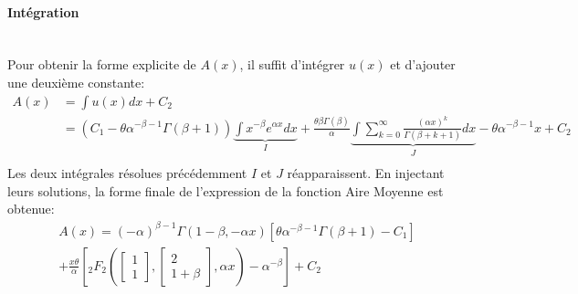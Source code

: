 \paragraph{Intégration}\phantom{}\\
Pour obtenir la forme explicite de $A(x)$, il suffit d'intégrer $u(x)$ et d'ajouter une deuxième constante:
\[
\begin{aligned}
    A(x) &= \int u(x)dx+C_2 \\
    &= (C_1-\theta\alpha^{-\beta-1}\Gamma(\beta+1))\underbrace{\int x^{-\beta}e^{\alpha x}dx}_I +\frac{\theta\beta\Gamma(\beta)}{\alpha}\underbrace{\int\sum_{k=0}^{\infty} \frac{{(\alpha x)}^k}{\Gamma(\beta+k+1)}dx}_J-\theta\alpha^{-\beta-1}x +C_2 \\
\end{aligned}
\]
Les deux intégrales résolues précédemment $I$ et $J$ réapparaissent. En injectant leurs solutions, la forme finale de l'expression de la fonction Aire Moyenne est obtenue: 
\begin{equation}\label{sol_area}
    \begin{aligned}
            A(x) = {(-\alpha)}^{\beta-1}\Gamma(1-\beta,-\alpha x)[\theta\alpha^{-\beta-1}\Gamma(\beta+1)-C_1]\\+\frac{x\theta}{\alpha}\left[{}_2F_2\left(\begin{bmatrix}1\\1\end{bmatrix},\begin{bmatrix}2\\1+\beta\end{bmatrix},\alpha x\right)-\alpha^{-\beta}\right] +C_2 
    \end{aligned}
\end{equation}


